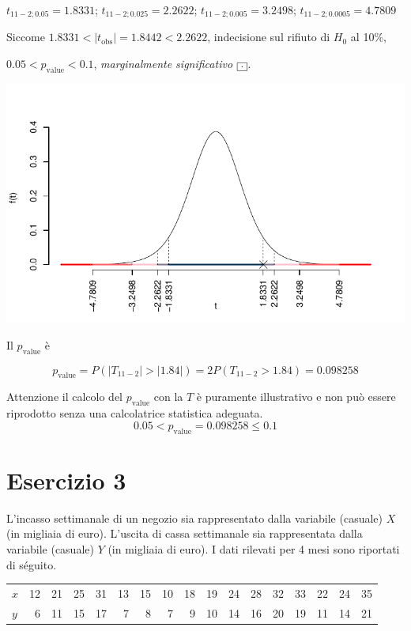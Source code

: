 \documentclass[
  11pt,
]{book}
\theoremstyle{mytheoremstyle}
\theoremstyle{mydefstyle}
\newenvironment{sol}
  {
  \begin{tcolorbox}[enhanced,breakable,arc=0.1mm,boxrule=1pt,colback=white,colframe=iblue,
  title=\bf \fontfamily{lmss}\selectfont \hspace{.5 cm} Soluzione,drop fuzzy shadow]

}{
\end{tcolorbox}
  }
\begin{document}
\begin{sol}
\(t_{11-2;0.05}=1.8331\); \(t_{11-2;0.025}=2.2622\); \(t_{11-2;0.005}=3.2498\); \(t_{11-2;0.0005}=4.7809\)

Siccome \(1.8331<|t_\text{obs}|=1.8442<2.2622\), indecisione sul rifiuto di \(H_0\) al 10\%,

\(0.05<p_\text{value}<0.1\), \emph{marginalmente significativo} \(\fbox{.}\).

\begin{center}\includegraphics{Esami_passati_con_soluzioni_files/figure-latex/06-regr-14,-1} \end{center}

Il \(p_{\text{value}}\) è

\[ p_{\text{value}} = P(|T_{11-2}|>|1.84|)=2P(T_{11-2}>1.84)=0.098258 \]

Attenzione il calcolo del \(p_\text{value}\) con la \(T\) è puramente illustrativo e non può essere riprodotto senza una calcolatrice statistica adeguata.\[
 0.05 < p_\text{value}= 0.098258 \leq 0.1 
\]

\end{sol}

\section{Esercizio 3}\label{esercizio-3-1}

L'incasso settimanale di un negozio sia rappresentato dalla
variabile (casuale) \(X\) (in migliaia di euro).
L'uscita di cassa settimanale sia rappresentata dalla variabile
(casuale) \(Y\) (in migliaia di euro).
I dati rilevati per 4 mesi sono riportati di séguito.

\begin{table}[H]
\centering
\begin{tabular}{lrrrrrrrrrrrrrrrr}
\toprule
$x$ & 12 & 21 & 25 & 31 & 13 & 15 & 10 & 18 & 19 & 24 & 28 & 32 & 33 & 22 & 24 & 35\\
$y$ & 6 & 11 & 15 & 17 & 7 & 8 & 7 & 9 & 10 & 14 & 16 & 20 & 19 & 11 & 14 & 21\\
\bottomrule
\end{tabular}
\end{table}
\end{document}
